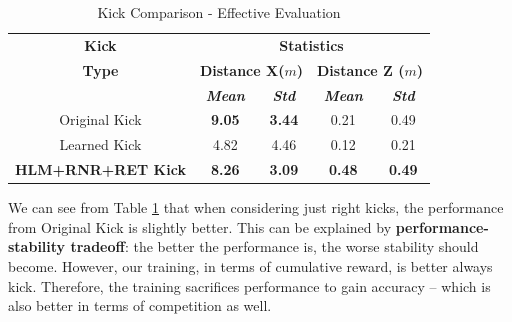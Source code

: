 \begin{table}[!htbp]
	\caption{Kick Comparison - Effective Evaluation}
	\begin{center} 
		\begin{tabular}{|c|c|c|c|c|}
			\hline
			\textbf{Kick}&\multicolumn{4}{|c|}{\textbf{Statistics}} \\
			\cline{2-5} 
			\textbf{Type} &  \multicolumn{2}{|c|}{\textbf{Distance X(\(m\))}}& 
			\multicolumn{2}{|c|}{\textbf{Distance Z (\(m\))}}\\
			\cline {2-5} 
			& \textbf{\textit{Mean}}& \textbf{\textit{Std}}
			& \textbf{\textit{Mean}}& \textbf{\textit{Std}} \\
			\hline
			Original Kick  & \textbf{9.05} & \textbf{3.44} & 0.21 & 0.49 \\
			\hline
			Learned Kick  & 4.82 & 4.46 & 0.12 & 0.21 \\
			\hline
			\textbf{HLM+RNR+RET Kick} & \textbf{8.26} & \textbf{3.09} & \textbf{0.48} & \textbf{0.49}  \\
			\hline
		\end{tabular}
		\label{tab:finaltesteff}
	\end{center}
\end{table}

We can see from Table \ref{tab:finaltesteff} that when considering just right kicks, the performance from Original Kick is slightly better. This can be explained by \textbf{performance-stability tradeoff}: the better the performance is, the worse stability should become. However, our training, in terms of cumulative reward, is better always kick. Therefore, the training sacrifices performance to gain accuracy -- which is also better in terms of competition as well.